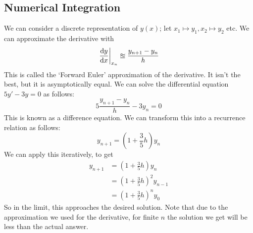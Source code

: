 \documentclass{article}
\begin{document}
\subsection{Numerical Integration}
We can consider a discrete representation of $y(x)$; let $x_1 \mapsto y_1, x_2 \mapsto y_2$ etc. We can approximate the derivative with
\[ \eval{\frac{\dd y}{\dd x}}_{x_n} \approxeq \frac{y_{n+1} - y_n}{h} \]
This is called the `Forward Euler' approximation of the derivative. It isn't the best, but it is asymptotically equal. We can solve the differential equation $5y' - 3y = 0$ as follows:
\[ 5 \frac{y_{n+1} - y_n}{h} - 3y_n = 0 \]
This is known as a difference equation. We can transform this into a recurrence relation as follows:
\[ y_{n+1} = \left( 1 + \frac{3}{5}h \right) y_n \]
We can apply this iteratively, to get
\begin{align*}
	y_{n+1} & = \left( 1 + \frac{3}{5}h \right) y_n       \\
	        & = \left( 1 + \frac{3}{5}h \right)^2 y_{n-1} \\
	        & = \left( 1 + \frac{3}{5}h \right)^n y_{0}
\end{align*}
So in the limit, this approaches the desired solution. Note that due to the approximation we used for the derivative, for finite $n$ the solution we get will be less than the actual answer.
\end{document}
